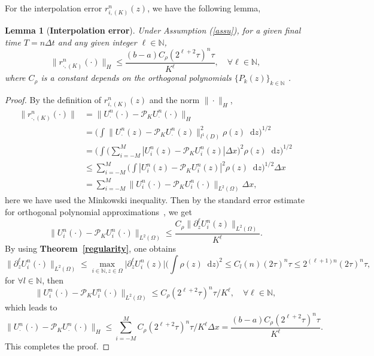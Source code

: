 \documentclass[12pt]{article}
\theoremstyle{plain}
\newtheorem{lemma}{Lemma}[section]
\theoremstyle{remark}
\theoremstyle{remark}
\theoremstyle{remark}
\numberwithin{equation}{section}
\newcommand*\diff{\mathop{}\!\mathrm{d}}
\newcommand{\N}{{\mathbb{N}}}
\newcommand{\p}{\mathcal{P}}
\newcommand{\dnz}[1]{\partial^{#1}_z}
\newcommand{\Dx}{\Delta x}
\newcommand{\Dt}{\Delta t}
\newcommand{\Uniz}{U^n_i(z)}
\begin{document}
For the interpolation error $r^n_{i,(K)}(z)$, we have the following lemma,
\begin{lemma}[{\bf Interpolation error}]\label{tr_e}
  Under  Assumption (\ref{assu}),  for a given final time $T = n\Dt$ and any given integer $\ell\in\N$,
  \begin{equation}
    \|r^n_{\cdot,(K)}(\cdot)\|_H \leq \frac{(b-a)C_\rho (2^{\ell+2}\tau)^n\tau}{K^\ell}, \quad\forall\ell\in\N,
  \end{equation}
  where $C_\rho$ is a constant depends on the orthogonal polynomials $\{P_k(z)\}_{k\in\N}$ .
\end{lemma}
\begin{proof}
  By the definition of $r^n_{i,(K)}(z)$ and the norm $\|\cdot\|_H$,
  \begin{equation}
    \begin{split}
      \|r^n_{\cdot,(K)}(\cdot)\| 
      & = \|U^n_\cdot(\cdot) - \p_K U^n_\cdot(\cdot)\|_H 
      \\
      & = \Bigg(\int\|U^n_\cdot(z) - \p_K U^n_\cdot(z)\|^2_{l^1(D)}\rho(z)\diff z\Bigg)^{1/2}
      \\
      & = \Bigg(\int\Big(\sum\limits_{i=-M}^M |U^n_i(z) - \p_K U^n_i(z)|\Dx\Big)^2\rho(z)\diff z\Bigg)^{1/2}
      \\
      & \leq \sum\limits_{i=-M}^M \Bigg(\int |U^n_i(z) - \p_K U^n_i(z)|^2\rho(z)\diff z\Bigg)^{1/2}\Dx
      \\
      & = \sum_{i=-M}^M \|U^n_i(\cdot) - \p_K U^n_i(\cdot)\|_{L^2(\Omega)}\Dx,
    \end{split}
  \end{equation}
  here we have used the Minkowski inequality. Then by the standard error estimate for orthogonal polynomial approximations~\cite{Quarteroni:1982bmba}, we get
  \begin{equation}
    \|U^n_i(\cdot) - \p_K U^n_i(\cdot)\|_{L^2(\Omega)}\leq \frac{C_\rho\|\dnz{\ell}\Uniz\|_{L^2(\Omega)}}{K^\ell}.
  \end{equation}
  By using {\bf Theorem~\ref{regularity}}, one obtains
  \begin{equation}
    \|\dnz{\ell}U^n_i(\cdot)\|_{L^2(\Omega)} \leq \underset{i\in\N, z\in\Omega}{\max}\big|\dnz{\ell}\Uniz\big| \Bigg(\int \rho(z)\diff z\Bigg)^2 \leq C_l(n)(2\tau)^n\tau \leq 2^{(\ell+1)n}(2\tau)^n\tau,
  \end{equation}
  for $\forall l\in\N$, then 
  \begin{equation}\label{err2}
    \|U^n_i(\cdot) - \p_K U^n_i(\cdot)\|_{L^2(\Omega)}\leq C_\rho (2^{\ell+2}\tau)^n\tau/K^\ell, \quad\forall\ell\in\N,
  \end{equation}
  which leads to
  \begin{equation}
      \|U^n_\cdot(\cdot) - \p_K U^n_\cdot(\cdot)\|_H \leq \sum_{i=-M}^M C_\rho (2^{\ell+2}\tau)^n\tau/K^\ell\Dx = \frac{(b-a)C_\rho (2^{\ell+2}\tau)^n\tau}{K^\ell}.
  \end{equation}
  This completes the proof.
\end{proof}
\end{document}

